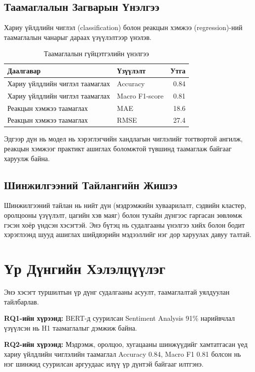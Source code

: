 \documentclass[12pt,a4paper]{report}
\begin{document}
\subsection{Таамаглалын Загварын Үнэлгээ}

Хариу үйлдлийн чиглэл (classification) болон реакцын хэмжээ (regression)-ний таамаглалын чанарыг дараах үзүүлэлтээр үнэлэв.

\begin{table}[H]
\centering
\caption{Таамаглалын гүйцэтгэлийн үнэлгээ}
\begin{tabular}{|l|l|r|}
\hline
\textbf{Даалгавар} & \textbf{Үзүүлэлт} & \textbf{Утга} \\
\hline
Хариу үйлдлийн чиглэл таамаглах & Accuracy & 0.84 \\
Хариу үйлдлийн чиглэл таамаглах & Macro F1-score & 0.81 \\
Реакцын хэмжээ таамаглах & MAE & 18.6 \\
Реакцын хэмжээ таамаглах & RMSE & 27.4 \\
\hline
\end{tabular}
\end{table}

Эдгээр дүн нь модел нь хэрэглэгчийн хандлагын чиглэлийг тогтвортой ангилж, реакцын хэмжээг практикт ашиглах боломжтой түвшинд таамаглаж байгааг харуулж байна.

\subsection{Шинжилгээний Тайлангийн Жишээ}

Шинжилгээний тайлан нь нийт дүн (мэдрэмжийн хуваарилалт, сэдвийн кластер, оролцооны үзүүлэлт, цагийн хэв маяг) болон тухайн дүнгээс гаргасан зөвлөмж гэсэн хоёр үндсэн хэсэгтэй. Энэ бүтэц нь судалгааны үнэлгээ хийх болон бодит хэрэглээнд шууд ашиглах шийдвэрийн мэдээллийг нэг дор харуулах давуу талтай.


\section{Үр Дүнгийн Хэлэлцүүлэг}

Энэ хэсэгт туршилтын үр дүнг судалгааны асуулт, таамаглалтай уялдуулан тайлбарлав.

\textbf{RQ1-ийн хүрээнд:} BERT-д суурилсан Sentiment Analysis 91\% нарийвчлал үзүүлсэн нь H1 таамаглалыг дэмжиж байна.

\textbf{RQ2-ийн хүрээнд:} Мэдрэмж, оролцоо, хугацааны шинжүүдийг хамтатгасан үед хариу үйлдлийн чиглэлийн таамаглал Accuracy 0.84, Macro F1 0.81 болсон нь нэг шинжид суурилсан аргуудаас илүү үр дүнтэй байгааг илтгэнэ.
\end{document}
